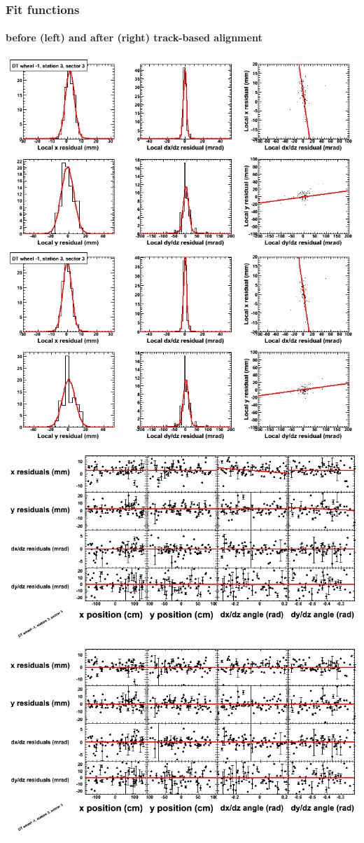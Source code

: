 \documentclass[compress]{beamer}
\begin{document}
\begin{frame}
\frametitle{Fit functions}
\framesubtitle{before (left) and after (right) track-based alignment}
\includegraphics[width=0.5\linewidth]{fitfunctions_re01/MBwhBst3sec03_bellcurves.png} \includegraphics[width=0.5\linewidth]{fitfunctions_re05/MBwhBst3sec03_bellcurves.png}

\includegraphics[width=0.5\linewidth]{fitfunctions_re01/MBwhBst3sec03_polynomials.png} \includegraphics[width=0.5\linewidth]{fitfunctions_re05/MBwhBst3sec03_polynomials.png}
\end{frame}
\end{document}
